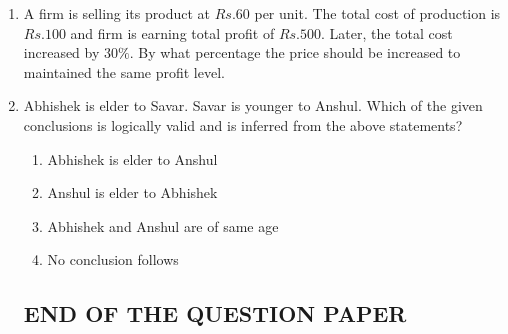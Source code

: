 \documentclass[journal,12pt,onecolumn]{IEEEtran}
\theoremstyle{remark}
\begin{document}
\begin{enumerate}[start = 26 ]
        \item A firm is selling its product at $Rs. 60$ per unit. The total cost of production is $Rs. 100$ and firm is earning total profit of $Rs. 500$. Later, the total cost increased by $30\%$. By what percentage the price should be increased to maintained the same profit level. \hfill{}
            \begin{enumerate}
            \end{enumerate}
        
         \item Abhishek is elder to Savar. Savar is younger to Anshul. Which of the given conclusions is logically valid and is inferred from the above statements? \hfill{}
            \begin{enumerate}
                \item Abhishek is elder to Anshul
                \item Anshul is elder to Abhishek
                \item Abhishek and Anshul are of same age
                \item No conclusion follows
            \end{enumerate}

\begin{center}
    \subsection*{END OF THE QUESTION PAPER}
\end{center}

    
    \end{enumerate}
\end{document}
